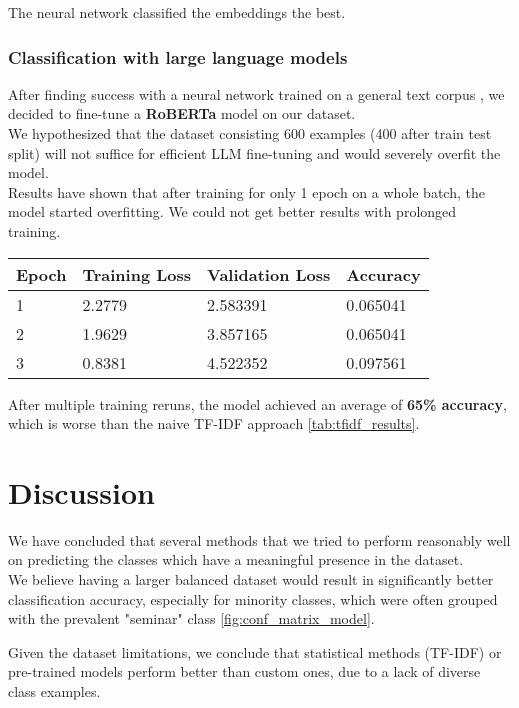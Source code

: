 \documentclass[fleqn,moreauthors,10pt]{ds_report}
\begin{document}
The neural network classified the embeddings the best.

\subsubsection{Classification with large language models}

After finding success with a neural network trained on a general text corpus \cite{liu2019roberta}, we decided to fine-tune a \textbf{RoBERTa} model on our dataset.  \\
We hypothesized that the dataset consisting 600 examples (400 after train test split) will not suffice for efficient LLM fine-tuning and would severely overfit the model.  \\

Results have shown that after training for only 1 epoch on a whole batch, the model started overfitting. We could not get better results with prolonged training. 

\begin{table}[!ht]
    \centering
    \begin{tabular}{|l|l|l|l|}
    \hline
        Epoch & Training Loss & Validation Loss & Accuracy \\ \hline
        1 & 2.2779 & 2.583391 & 0.065041 \\ \hline
        2 & 1.9629 & 3.857165 & 0.065041 \\ \hline
        3 & 0.8381 & 4.522352 & 0.097561 \\ \hline
    \end{tabular}
\end{table}

After multiple training reruns, the model achieved an average of \textbf{65\% accuracy}, which is worse than the naive TF-IDF approach \ref{tab:tfidf_results}.


\section*{Discussion}

We have concluded that several methods that we tried to perform reasonably well on predicting the classes which have a meaningful presence in the dataset. \\

We believe having a larger balanced dataset would result in significantly better classification accuracy, especially for minority classes, which were often grouped with the prevalent "seminar" class \ref{fig:conf_matrix_model}.

Given the dataset limitations, we conclude that statistical methods (TF-IDF) or pre-trained models perform better than custom ones, due to a lack of diverse class examples. \\



\end{document}
